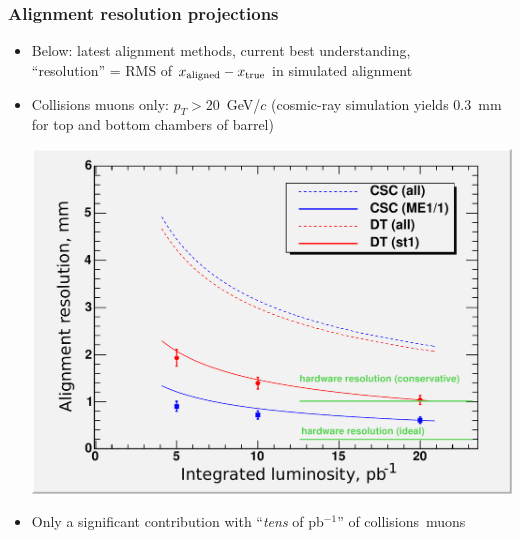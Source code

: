 \documentclass[compress]{beamer}
\newcommand{\s}[1]{{\mbox{\scriptsize #1}}}
\begin{document}
\begin{frame}
\frametitle{Alignment resolution projections}

\begin{itemize}
\item Below: latest alignment methods, current best understanding, \\
  ``resolution'' = RMS of $x_\s{aligned} - x_\s{true}$ in simulated alignment
\item Collisions muons only: $p_T > 20$~GeV/$c$ (cosmic-ray simulation
  yields 0.3~mm for top and bottom chambers of barrel)
\begin{center}
\includegraphics[width=0.65\linewidth]{st1_me11.pdf}
\end{center}
\item Only a significant contribution with ``{\it tens} of pb$^{-1}$'' of \mbox{collisions muons\hspace{-1 cm}}
\end{itemize}
\end{frame}
\end{document}
